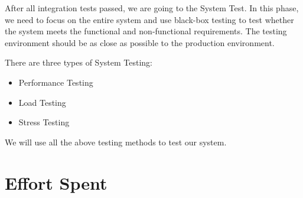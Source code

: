\documentclass[a4paper,12pt]{report}
\begin{document}
After all integration tests passed, we are going to the System Test.
In this phase, we need to focus on the entire system and use black-box testing to test whether the system meets the functional and non-functional requirements.
The testing environment should be as close as possible to the production environment.\cite{SlidesSE2}

\vspace{3mm}

There are three types of System Testing:
\begin{itemize}
	\item Performance Testing
	\item Load Testing
	\item Stress Testing
\end{itemize}

We will use all the above testing methods to test our system.

\chapter{Effort Spent}
\end{document}
